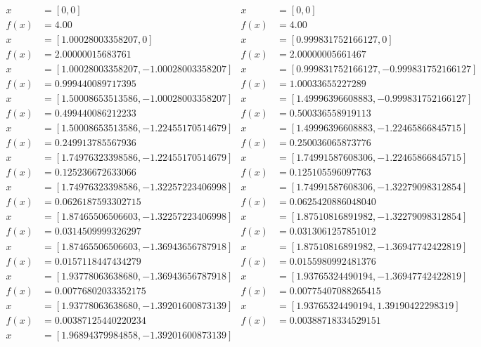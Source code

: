 \documentclass[a4paper,12pt]{article}
\begin{document}
\begin{align*}
x &= [0, 0] & x &= [0,0] \\
f(x) &= 4.00 & f(x) &= 4.00 \\
\hline
x &= [1.00028003358207, 0] & 
x &= [0.999831752166127, 0] \\
f(x) &= 2.00000015683761 & 
f(x) &= 2.00000005661467 \\
\hline 
x &= [1.00028003358207, -1.00028003358207] & 
x &= [0.999831752166127, -0.999831752166127] \\
f(x) &= 0.999440089717395 & 
f(x) &= 1.00033655227289 \\
\hline 
x &= [1.50008653513586, -1.00028003358207] & 
x &= [1.49996396608883, -0.999831752166127] \\
f(x) &= 0.499440086212233 & 
f(x) &= 0.500336558919113 \\
\hline 
x &= [1.50008653513586, -1.22455170514679] & 
x &= [1.49996396608883, -1.22465866845715] \\
f(x) &= 0.249913785567936 & 
f(x) &= 0.250036065873776 \\
\hline 
x &= [1.74976323398586, -1.22455170514679] & 
x &= [1.74991587608306, -1.22465866845715] \\
f(x) &= 0.125236672633066 & 
f(x) &= 0.125105596097763 \\
\hline 
x &= [1.74976323398586, -1.32257223406998] & 
x &= [1.74991587608306, -1.32279098312854] \\
f(x) &= 0.0626187593302715 & 
f(x) &= 0.0625420886048040 \\
\hline 
x &= [1.87465506506603, -1.32257223406998] & 
x &= [1.87510816891982, -1.32279098312854] \\
f(x) &= 0.0314509999326297 & 
f(x) &= 0.0313061257851012 \\
\hline 
x &= [1.87465506506603, -1.36943656787918] & 
x &= [1.87510816891982, -1.36947742422819] \\
f(x) &= 0.0157118447434279 & 
f(x) &= 0.0155980992481376 \\
\hline 
x &= [1.93778063638680, -1.36943656787918] & 
x &= [1.93765324490194, -1.36947742422819] \\
f(x) &= 0.00776802033352175 & 
f(x) &= 0.00775407088265415 \\
\hline 
x &= [1.93778063638680, -1.39201600873139] & 
x &= [1.93765324490194, 1.39190422298319] \\
f(x) &= 0.00387125440220234 & 
f(x) &= 0.00388718334529151 \\
\hline 
x &= [1.96894379984858, -1.39201600873139] & 

\end{align*}
\end{document}
